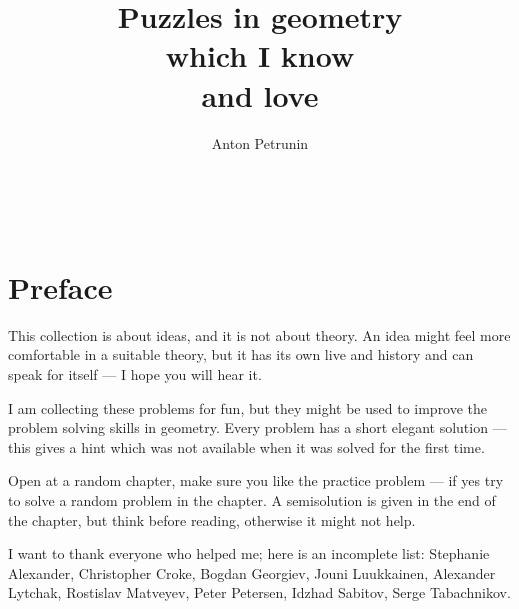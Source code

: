 \documentclass[twoside]{book}
\begin{document}
\title{Puzzles in geometry \\
which I know \\ and love}
\author{Anton Petrunin}

\date{}
\maketitle



\null\vfill{}

\ 

\thispagestyle{empty}
\thispagestyle{empty}
\tableofcontents
\thispagestyle{empty}

\newpage
\thispagestyle{empty}
\section*{Preface}

This collection is about ideas, and it is not about theory.
An idea might feel more comfortable in a suitable theory,
but it has its own live and history and can speak for itself --- I hope you will hear it.

I am collecting these problems for fun, 
but they might be used to improve 
the problem solving skills in geometry.
Every problem has a short elegant solution ---
this gives a hint which was not available
when it was solved for the first time.

Open at a random chapter, make sure you like the practice problem --- if yes try to solve a random problem in the chapter.
A semisolution is given in the end of the chapter,
but think before reading,
otherwise it might not help. 

I want to thank everyone who helped me;
here is an incomplete list:
Stephanie Alexander,
Christopher Croke,
Bogdan Georgiev,
Jouni Luukkainen,
Alexander Lytchak,
Rostislav Matveyev, 
Peter Petersen, 
Idzhad Sabitov,
Serge Tabachnikov.
\end{document}
